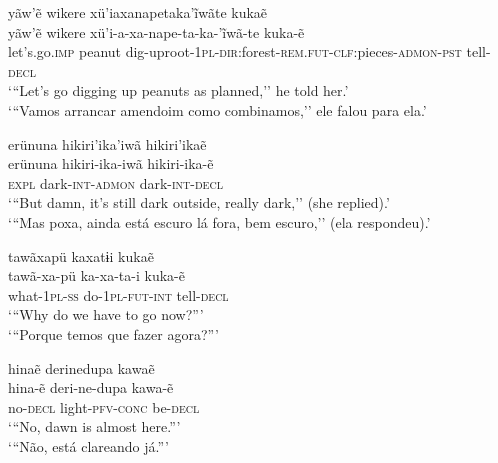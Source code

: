 \documentclass[output=paper,
modfonts,nonflat
]{langsci/langscibook}
\begin{document}
\ea   yãw'ẽ wikere xü'iaxanapetaka'ĩwãte kukaẽ \\[.3em]
\gll yãw'ẽ wikere xü'i-a-xa-nape-ta-ka-'ĩwã-te kuka-ẽ\\
let's.go.\textsc{imp} peanut dig-uproot-\textsc{1pl-dir:}forest-\textsc{rem.fut}-\textsc{clf}:pieces-\textsc{admon-pst} tell-\textsc{decl}\\
\glt    `{``}Let's go digging up peanuts as planned,'' he told her.' \\
`{``}Vamos arrancar amendoim como combinamos,'' ele falou para ela.' \\
\z


\ea   erünuna hikiri'ika'iwã hikiri'ikaẽ \\[.3em]
\gll erünuna hikiri-ika-iwã hikiri-ika-ẽ \\
\textsc{expl} dark-\textsc{int-admon} dark-\textsc{int-decl}\\
\glt    `{``}But damn, it's still dark outside, really dark,'' (she replied).' \\
`{``}Mas poxa, ainda está escuro lá fora, bem escuro,'' (ela respondeu).' \\
\z

\ea   tawãxapü kaxatɨi kukaẽ \\[.3em]                                
\gll tawã-xa-pü ka-xa-ta-i kuka-ẽ \\
what-\textsc{1pl-ss} do-\textsc{1pl-fut-int} tell-\textsc{decl}\\
\glt    `{``}Why do we have to go now?{''}' \\
`{``}Porque temos que fazer agora?{''}' \\
\z

\ea  hinaẽ derinedupa kawaẽ  \\[.3em]
\gll hina-ẽ deri-ne-dupa kawa-ẽ \\
no-\textsc{decl} light-\textsc{pfv-conc} be-\textsc{decl}\\
\glt    `{``}No, dawn is almost here.{''}' \\
`{``}Não, está clareando já.{''}' \\
\z
\end{document}
